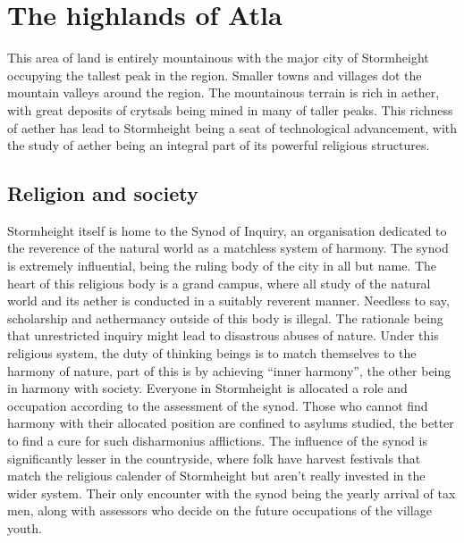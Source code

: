 \documentclass[a4paper,11pt,oneside]{book}
\newcommand{\textlf}[1]{\textbf{\titlecap{#1}}}
\begin{document}
%



\chapter{The highlands of Atla}
This area of land is entirely mountainous with the major city of Stormheight occupying the tallest peak in the region. Smaller towns and villages dot the mountain valleys around the region. The mountainous terrain is rich in aether, with great deposits of crytsals being mined in many of taller peaks. This richness of aether has lead to Stormheight being a seat of technological advancement, with the study of aether being an integral part of its powerful religious structures.  

\section{Religion and society}
Stormheight itself is home to the Synod of Inquiry, an organisation dedicated to the reverence of the natural world as a matchless system of harmony. The synod is extremely influential, being the ruling body of the city in all but name. The heart of this religious body is a grand campus, where all study of the natural world and its aether is conducted in a suitably reverent manner. Needless to say, scholarship and aethermancy outside of this body is illegal. The rationale being that unrestricted inquiry might lead to disastrous abuses of nature. Under this religious system, the duty of thinking beings is to match themselves to the harmony of nature, part of this is by achieving ``inner harmony'', the other being in harmony with society. Everyone in Stormheight is allocated a role and occupation according to the assessment of the synod. Those who cannot find harmony with their allocated position are confined to asylums studied, the better to find a cure for such disharmonius afflictions. The influence of the synod is significantly lesser in the countryside, where folk have harvest festivals that match the religious calender of Stormheight but aren't really invested in the wider system. Their only encounter with the synod being the yearly arrival of tax men, along with assessors who decide on the future occupations of the village youth.
\end{document}
